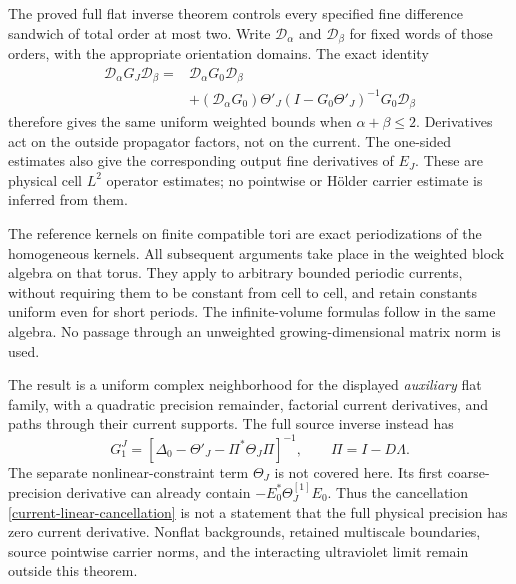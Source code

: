 \documentclass[11pt]{article}
\theoremstyle{remark}
\begin{document}
The proved full flat inverse theorem controls every specified fine
difference sandwich of total order at most two. Write
$\mathcal D_\alpha$ and $\mathcal D_\beta$ for fixed words of those
orders, with the appropriate orientation domains. The exact identity
\begin{equation}
 \begin{split}
 \mathcal D_\alpha G_J\mathcal D_\beta
 ={}&\mathcal D_\alpha G_0\mathcal D_\beta\\
 &+(\mathcal D_\alpha G_0)\Theta'_J
       (I-G_0\Theta'_J)^{-1}G_0\mathcal D_\beta
 \end{split}
 \label{current-spatial-derivative-transfer}
\end{equation}
therefore gives the same uniform weighted bounds when
$\alpha+\beta\le2$. Derivatives act on the outside propagator
factors, not on the current. The one-sided estimates also give
the corresponding output fine derivatives of $E_J$. These are
physical cell $L^2$ operator estimates; no pointwise or H\"older
carrier estimate is inferred from them.

The reference kernels on finite compatible tori are exact
periodizations of the homogeneous kernels. All subsequent arguments
take place in the weighted block algebra on that torus. They apply
to arbitrary bounded periodic currents, without requiring them to
be constant from cell to cell, and retain constants uniform even
for short periods. The infinite-volume formulas follow in the
same algebra. No passage through an unweighted growing-dimensional
matrix norm is used.

The result is a uniform complex neighborhood for the displayed
\emph{auxiliary} flat family, with a quadratic precision remainder,
factorial current derivatives, and paths through their current
supports. The full source inverse instead has
\[
 G_1^J=[\Delta_0-\Theta'_J-\Pi^*\Theta_J\Pi]^{-1},
 \qquad \Pi=I-D\Lambda.
\]
The separate nonlinear-constraint term $\Theta_J$ is not covered
here. Its first coarse-precision derivative can already contain
$-E_0^*\Theta^{[1]}_J E_0$. Thus the cancellation
\eqref{current-linear-cancellation} is not a statement that the
full physical precision has zero current derivative. Nonflat
backgrounds, retained multiscale boundaries, source pointwise
carrier norms, and the interacting ultraviolet limit remain
outside this theorem.
\end{document}
